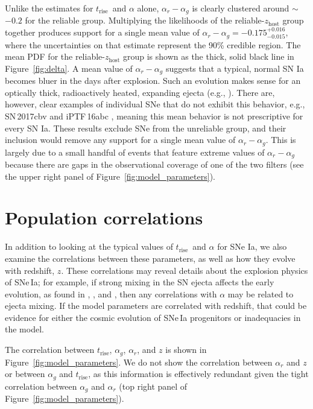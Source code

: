 \documentclass[twocolumn]{./aastex63}
\newcommand{\trise}{$t_\mathrm{rise}$}
\begin{document}
Unlike the estimates for \trise\ and $\alpha$ alone, $\alpha_r - \alpha_g$ is
clearly clustered around $\sim$${-0.2}$ for the reliable group. Multiplying
the likelihoods of the reliable-$z_\mathrm{host}$ group together produces
support for a single mean value of $\alpha_r - \alpha_g =
-0.175^{+0.016}_{-0.015}$, where the uncertainties on that estimate represent
the 90\% credible region. The mean PDF for the reliable-$z_\mathrm{host}$
group is shown as the thick, solid black line in Figure~\ref{fig:delta}. A
mean value of $\alpha_r - \alpha_g$ suggests that a typical, normal SN Ia
becomes bluer in the days after explosion. Such an evolution makes sense for
an optically thick, radioactively heated, expanding ejecta (e.g.,
\citealt{Piro16,Magee20}). There are, however, clear examples of individual
SNe that do not exhibit this behavior, e.g., SN\,2017cbv
\citep{Hosseinzadeh17} and iPTF\,16abc \citep{Miller18}, meaning this mean
behavior is not prescriptive for every SN Ia. These results exclude SNe from
the unreliable group, and their inclusion would remove any support for a
single mean value of $\alpha_r - \alpha_g$. This is largely due to a small
handful of events that feature extreme values of $\alpha_r - \alpha_g$ because
there are gaps in the observational coverage of one of the two filters (see
the upper right panel of Figure~\ref{fig:model_parameters}).

\section{Population correlations}

In addition to looking at the typical values of \trise\ and $\alpha$ for SNe
Ia, we also examine the correlations between these parameters, as well as how
they evolve with redshift, $z$. These correlations may reveal details about
the explosion physics of SNe\,Ia; for example, if strong mixing in the SN
ejecta affects the early evolution, as found in \citet{Piro16},
\citet{Magee18}, and \citet{Magee20}, then any correlations with $\alpha$ may
be related to ejecta mixing. If the model parameters are correlated with
redshift, that could be evidence for either the cosmic evolution of SNe\,Ia
progenitors or inadequacies in the model.

The correlation between $t_\mathrm{rise}$, $\alpha_g$, $\alpha_r$, and $z$ is
shown in Figure~\ref{fig:model_parameters}. We do not show the correlation
between $\alpha_r$ and $z$ or between $\alpha_g$ and \trise, as this
information is effectively redundant given the tight correlation between
$\alpha_g$ and $\alpha_r$ (top right panel of
Figure~\ref{fig:model_parameters}).
\end{document}
